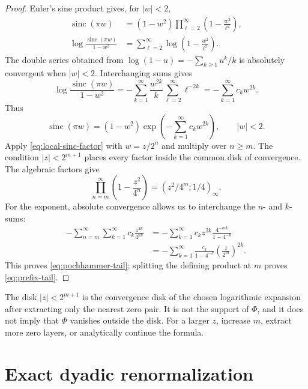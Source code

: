 \documentclass[11pt,oneside]{article}
\numberwithin{equation}{section}
\theoremstyle{definition}
\theoremstyle{remark}
\newcommand{\abs}[1]{\left|#1\right|}
\newcommand{\sinc}{\operatorname{sinc}}
\newcommand{\PhiUp}{\Phi}
\begin{document}
\begin{proof}
Euler's sine product gives, for \(\abs w<2\),
\begin{align*}
 \sinc(\pi w)
 &=(1-w^2)\prod_{\ell=2}^{\infty}
       \left(1-\frac{w^2}{\ell^2}\right),\\
 \log\frac{\sinc(\pi w)}{1-w^2}
 &=\sum_{\ell=2}^{\infty}\log\left(1-\frac{w^2}{\ell^2}\right).
\end{align*}
The double series obtained from \(\log(1-u)=-\sum_{k\ge1}u^k/k\) is absolutely
convergent when \(\abs w<2\).  Interchanging sums gives
\[
 \log\frac{\sinc(\pi w)}{1-w^2}
 =-\sum_{k=1}^{\infty}\frac{w^{2k}}{k}
   \sum_{\ell=2}^{\infty}\ell^{-2k}
 =-\sum_{k=1}^{\infty}c_kw^{2k}.
\]
Thus
\begin{equation}
 \sinc(\pi w)=(1-w^2)
 \exp\!\left(-\sum_{k=1}^{\infty}c_kw^{2k}\right),
 \qquad \abs w<2.
 \label{eq:local-sinc-factor}
\end{equation}
Apply \eqref{eq:local-sinc-factor} with \(w=z/2^n\) and multiply over \(n\ge m\).  The
condition \(\abs z<2^{m+1}\) places every factor inside the common disk of convergence.  The
algebraic factors give
\[
 \prod_{n=m}^{\infty}\left(1-\frac{z^2}{4^n}\right)
 =\left(z^2/4^m;1/4\right)_\infty.
\]
For the exponent, absolute convergence allows us to interchange the \(n\)- and \(k\)-sums:
\begin{align*}
 -\sum_{n=m}^{\infty}\sum_{k=1}^{\infty}c_k\frac{z^{2k}}{4^{nk}}
 &=-\sum_{k=1}^{\infty}c_kz^{2k}
   \frac{4^{-mk}}{1-4^{-k}}\\
 &=-\sum_{k=1}^{\infty}\frac{c_k}{1-4^{-k}}
   \left(\frac{z}{2^m}\right)^{2k}.
\end{align*}
This proves \eqref{eq:pochhammer-tail}; splitting the defining product at \(m\) proves
\eqref{eq:prefix-tail}.
\end{proof}

\begin{pitfallbox}
The disk \(\abs z<2^{m+1}\) is the convergence disk of the chosen logarithmic expansion
after extracting only the nearest zero pair.  It is not the support of \(\PhiUp\), and it
does not imply that \(\PhiUp\) vanishes outside the disk.  For a larger \(z\), increase
\(m\), extract more zero layers, or analytically continue the formula.
\end{pitfallbox}

\section{Exact dyadic renormalization}
\label{sec:dyadic}
\end{document}
